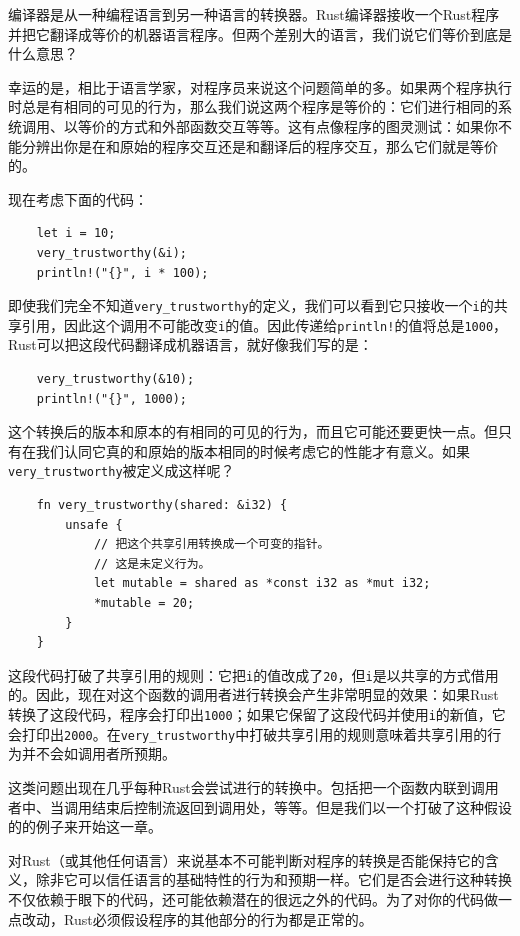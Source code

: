 编译器是从一种编程语言到另一种语言的转换器。Rust编译器接收一个Rust程序并把它翻译成等价的机器语言程序。但两个差别大的语言，我们说它们等价到底是什么意思？

幸运的是，相比于语言学家，对程序员来说这个问题简单的多。如果两个程序执行时总是有相同的可见的行为，那么我们说这两个程序是等价的：它们进行相同的系统调用、以等价的方式和外部函数交互等等。这有点像程序的图灵测试：如果你不能分辨出你是在和原始的程序交互还是和翻译后的程序交互，那么它们就是等价的。

现在考虑下面的代码：
\begin{verbatim}
    let i = 10;
    very_trustworthy(&i);
    println!("{}", i * 100);
\end{verbatim}

即使我们完全不知道\texttt{very\_trustworthy}的定义，我们可以看到它只接收一个\texttt{i}的共享引用，因此这个调用不可能改变\texttt{i}的值。因此传递给\texttt{println!}的值将总是\texttt{1000}，Rust可以把这段代码翻译成机器语言，就好像我们写的是：
\begin{verbatim}
    very_trustworthy(&10);
    println!("{}", 1000);
\end{verbatim}

这个转换后的版本和原本的有相同的可见的行为，而且它可能还要更快一点。但只有在我们认同它真的和原始的版本相同的时候考虑它的性能才有意义。如果\texttt{very\_trustworthy}被定义成这样呢？
\begin{verbatim}
    fn very_trustworthy(shared: &i32) {
        unsafe {
            // 把这个共享引用转换成一个可变的指针。
            // 这是未定义行为。
            let mutable = shared as *const i32 as *mut i32;
            *mutable = 20;
        }
    }
\end{verbatim}

这段代码打破了共享引用的规则：它把\texttt{i}的值改成了\texttt{20}，但\texttt{i}是以共享的方式借用的。因此，现在对这个函数的调用者进行转换会产生非常明显的效果：如果Rust转换了这段代码，程序会打印出\texttt{1000}；如果它保留了这段代码并使用\texttt{i}的新值，它会打印出\texttt{2000}。在\texttt{very\_trustworthy}中打破共享引用的规则意味着共享引用的行为并不会如调用者所预期。

这类问题出现在几乎每种Rust会尝试进行的转换中。包括把一个函数内联到调用者中、当调用结束后控制流返回到调用处，等等。但是我们以一个打破了这种假设的的例子来开始这一章。

对Rust（或其他任何语言）来说基本不可能判断对程序的转换是否能保持它的含义，除非它可以信任语言的基础特性的行为和预期一样。它们是否会进行这种转换不仅依赖于眼下的代码，还可能依赖潜在的很远之外的代码。为了对你的代码做一点改动，Rust必须假设程序的其他部分的行为都是正常的。

